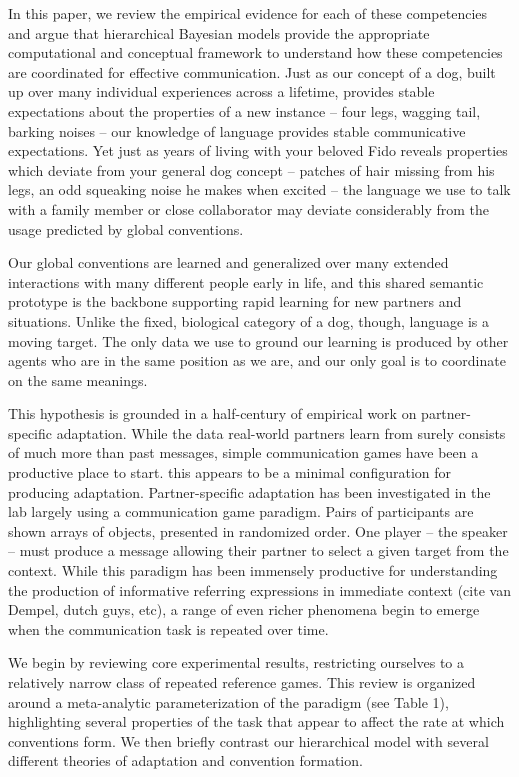 \documentclass[11pt, floatsintext, man]{apa6}
\begin{document}
In this paper, we review the empirical evidence for each of these competencies and argue that hierarchical Bayesian models provide the appropriate computational and conceptual framework to understand how these competencies are coordinated for effective communication. Just as our concept of a dog, built up over many individual experiences across a lifetime, provides stable expectations about the properties of a new instance -- four legs, wagging tail, barking noises -- our knowledge of language provides stable communicative expectations. Yet just as years of living with your beloved Fido reveals properties which deviate from your general dog concept -- patches of hair missing from his legs, an odd squeaking noise he makes when excited -- the language we use to talk with a family member or close collaborator may deviate considerably from the usage predicted by global conventions.

Our global conventions are learned and generalized over many extended interactions with many different people early in life, and this shared semantic prototype is the backbone supporting rapid learning for new partners and situations. Unlike the fixed, biological category of a dog, though, language is a moving target. The only data we use to ground our learning is produced by other agents who are in the same position as we are, and our only goal is to coordinate on the same meanings.

This hypothesis is grounded in a half-century of empirical work on partner-specific adaptation. While the data real-world partners learn from surely consists of much more than past messages, simple communication games have been a productive place to start. this appears to be a minimal configuration for producing adaptation.  Partner-specific adaptation has been investigated in the lab largely using a communication game paradigm. Pairs of participants are shown arrays of objects, presented in randomized order. One player -- the speaker -- must produce a message allowing their partner to select a given target from the context. While this paradigm has been immensely productive for understanding the production of informative referring expressions in immediate context (cite van Dempel, dutch guys, etc), a range of even richer phenomena begin to emerge when the communication task is repeated over time. 

We begin by reviewing core experimental results, restricting ourselves to a relatively narrow class of repeated reference games. This review is  organized around a meta-analytic parameterization of the paradigm (see Table 1), highlighting several properties of the task that appear to affect the rate at which conventions form. We then briefly contrast our hierarchical model with several different theories of adaptation and convention formation. 
\end{document}
